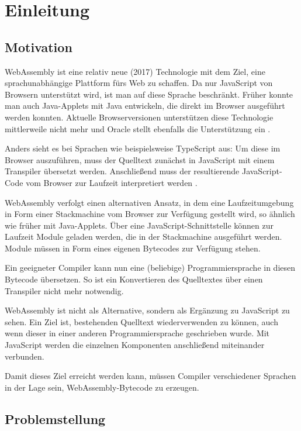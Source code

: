 \chapter{Einleitung}

\section{Motivation}

WebAssembly \cite{WebAssemblyWebsite} ist eine relativ neue (2017) Technologie mit dem Ziel, eine sprachunabhängige Plattform fürs Web zu schaffen. Da nur JavaScript von Browsern unterstützt wird, ist man auf diese Sprache beschränkt. Früher konnte man auch Java-Applets mit Java entwickeln, die direkt im Browser ausgeführt werden konnten. Aktuelle Browserversionen unterstützen diese Technologie mittlerweile nicht mehr und Oracle stellt ebenfalls die Unterstützung ein \cite{OracleJavaSESupportRoadmap}.

Anders sieht es bei Sprachen wie beispielsweise TypeScript aus: Um diese im Browser auszuführen, muss der Quelltext zunächst in JavaScript mit einem Transpiler übersetzt werden. Anschließend muss der resultierende JavaScript-Code vom Browser zur Laufzeit interpretiert werden \cite{TypeScript}.

WebAssembly verfolgt einen alternativen Ansatz, in dem eine Laufzeitumgebung in Form einer Stackmachine vom Browser zur Verfügung gestellt wird, so ähnlich wie früher mit Java-Applets. Über eine JavaScript-Schnittstelle können zur Laufzeit Module geladen werden, die in der Stackmachine ausgeführt werden. Module müssen in Form eines eigenen Bytecodes zur Verfügung stehen.

Ein geeigneter Compiler kann nun eine (beliebige) Programmiersprache in diesen Bytecode übersetzen. So ist ein Konvertieren des Quelltextes über einen Transpiler nicht mehr notwendig.

WebAssembly ist nicht als Alternative, sondern als Ergänzung zu JavaScript zu sehen. Ein Ziel ist, bestehenden Quelltext wiederverwenden zu können, auch wenn dieser in einer anderen Programmiersprache geschrieben wurde. Mit JavaScript werden die einzelnen Komponenten anschließend miteinander verbunden.

Damit dieses Ziel erreicht werden kann, müssen Compiler verschiedener Sprachen in der Lage sein, WebAssembly-Bytecode zu erzeugen.

\section{Problemstellung}

